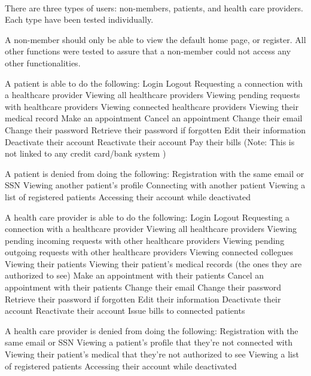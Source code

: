 \documentclass[12pt]{report}
\begin{document}
\paragraph{} 
There are three types of users: non-members, patients, and health care providers. Each type have been tested individually.

A non-member should only be able to view the default home page, or register. All other functions were tested to assure that a non-member could not access any other functionalities. 

A patient is able to do the following:
\bullet Login
\bullet Logout
\bullet Requesting a connection with a healthcare provider
\bullet Viewing all healthcare providers
\bullet Viewing pending requests with healthcare providers
\bullet Viewing connected healthcare providers
\bullet Viewing their medical record
\bullet Make an appointment 
\bullet Cancel an appointment
\bullet Change their email
\bullet Change their password
\bullet Retrieve their password if forgotten
\bullet Edit their information
\bullet Deactivate their account
\bullet Reactivate their account
\bullet Pay their bills (Note: This is not linked to any credit card/bank system ) 

A patient is denied from doing the following:
\bullet Registration with the same email or SSN 
\bullet Viewing another patient's profile
\bullet Connecting with another patient
\bullet Viewing a list of registered patients
\bullet Accessing their account while deactivated

A health care provider is able to do the following:
\bullet Login
\bullet Logout
\bullet Requesting a connection with a healthcare provider
\bullet Viewing all healthcare providers
\bullet Viewing pending incoming requests with other healthcare providers
\bullet Viewing pending outgoing requests with other healthcare providers
\bullet Viewing connected collegues
\bullet Viewing their patients
\bullet Viewing their patient's medical records (the ones they are authorized to see)
\bullet Make an appointment with their patients
\bullet Cancel an appointment with their patients
\bullet Change their email
\bullet Change their password
\bullet Retrieve their password if forgotten
\bullet Edit their information
\bullet Deactivate their account
\bullet Reactivate their account
\bullet Issue bills to connected patients

A health care provider is denied from doing the following:
\bullet Registration with the same email or SSN 
\bullet Viewing a patient's profile that they're not connected with
\bullet Viewing their patient's medical that they're not authorized to see
\bullet Viewing a list of registered patients
\bullet Accessing their account while deactivated
\end{document}

